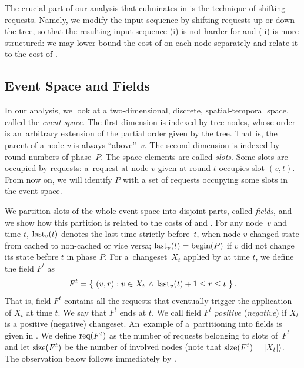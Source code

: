 The crucial part of our analysis that culminates in
 is the technique of shifting requests. Namely, we
modify the input sequence by shifting requests up or down the tree, so that
the resulting input sequence (i) is not harder for \OPT and (ii) is more
structured: we may lower bound the cost of \OPT on each node separately and
relate it to the cost of \ALGTC.



\subsection{Event Space and Fields}
\label{sec:event}

In our analysis, we look at a two-dimensional, discrete, spatial-temporal
space, called the \emph{event space}. The first dimension is indexed by tree
nodes, whose order is an~arbitrary extension of the partial order given by the
tree. That is, the parent of a node $v$ is always ``above''~$v$. The second
dimension is indexed by round numbers of phase~$P$. The space elements are
called \emph{slots}. Some slots are occupied by requests: a~request at node
$v$ given at round $t$ occupies slot $(v,t)$. From now on, we will identify
$P$ with a set of requests occupying some slots in the event space.

We partition slots of the whole event space into disjoint parts, called
\emph{fields}, and we show how this partition is related to the costs of \ALGTC
and \OPT. For any node~$v$ and time $t$, $\textrm{last}_v(t)$ denotes the last time
strictly before~$t$, when node $v$ changed state from cached to non-cached or
vice versa; $\textrm{last}_v(t) = \textrm{begin}(P)$ if $v$ did not change its state before $t$ in
phase $P$. For a~changeset~$X_t$ applied by
\ALGTC at time $t$, we define the field $F^t$ as
\[
  F^t = \left\{\ (v,r) : v \in X_t \, \wedge\, \textrm{last}_v(t)+1 \leq r \leq t\ \right\}.
\]
That is, field $F^t$ contains all the requests that eventually trigger the
application of $X_t$ at time $t$. We say that $F^t$ ends at $t$. We call field
$F^t$ \emph{positive} (\emph{negative}) if $X_t$ is a positive (negative)
changeset. An~example of a~partitioning into fields is given in
. We define $\textrm{req}(F^t)$ as the number of requests
belonging to slots of~$F^t$ and let $\textrm{size}(F^t)$ be the number of involved
nodes (note that $\textrm{size}(F^t) = |X_t|)$. The observation below follows
immediately by .


